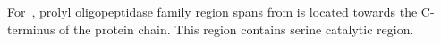 For~, prolyl oligopeptidase family region spans from is located towards the C-terminus of the protein chain. This region contains serine catalytic region.  